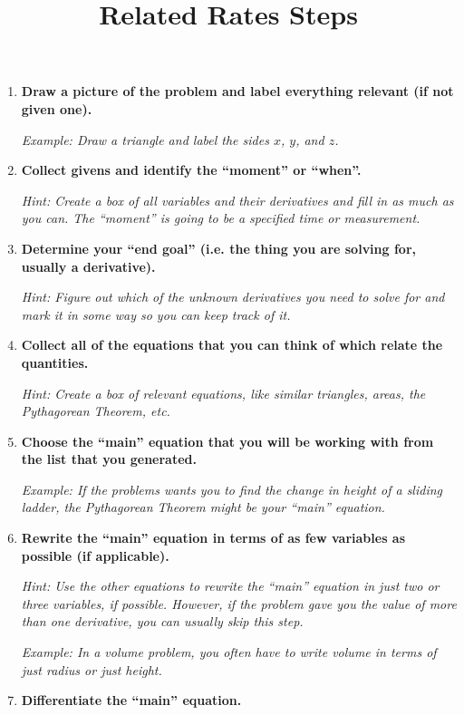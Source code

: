 \documentclass{siproblemset}
\title{Related Rates Steps}
\begin{document}
    \maketitle
    
    \begin{enumerate}
        \item \textbf{Draw a picture of the problem and label everything relevant (if not given one).}
        
        \textit{Example: Draw a triangle and label the sides $x$, $y$, and $z$.}
        \item \textbf{Collect givens and identify the ``moment'' or ``when''.}
        
        \textit{Hint: Create a box of all variables and their derivatives and fill in as much as you can. The ``moment'' is going to be a specified time or measurement.}
        \item \textbf{Determine your ``end goal'' (i.e. the thing you are solving for, usually a derivative).}
        
        \textit{Hint: Figure out which of the unknown derivatives you need to solve for and mark it in some way so you can keep track of it.}
        \item \textbf{Collect all of the equations that you can think of which relate the quantities.}
        
        \textit{Hint: Create a box of relevant equations, like similar triangles, areas, the Pythagorean Theorem, etc.}
        \item \textbf{Choose the ``main'' equation that you will be working with from the list that you generated.}
        
        \textit{Example: If the problems wants you to find the change in height of a sliding ladder, the Pythagorean Theorem might be your ``main'' equation.}
        \item \textbf{Rewrite the ``main'' equation in terms of as few variables as possible (if applicable).}
        
        \textit{Hint: Use the other equations to rewrite the ``main'' equation in just two or three variables, if possible. However, if the problem gave you the value of more than one derivative, you can usually skip this step.}
        
        \textit{Example: In a volume problem, you often have to write volume in terms of just radius or just height.}
        \item \textbf{Differentiate the ``main'' equation.}
        

\end{enumerate}
\end{document}
